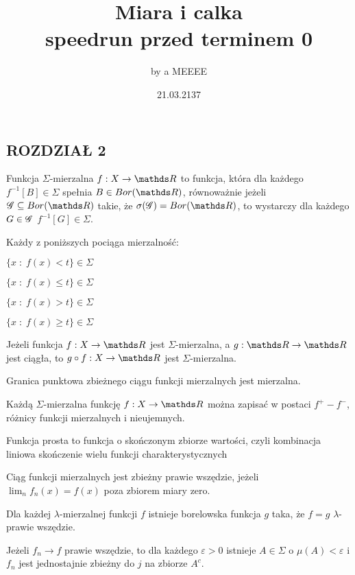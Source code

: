 \documentclass{article}[13pt]
\title{Miara i calka\medskip\\{\normalsize speedrun przed terminem 0}}
\author{by a MEEEE}
\date {21.03.2137}
\newcommand{\bor}{Bor(\R)}
\begin{document}
\maketitle
\thispagestyle{empty}

\subsection*{ROZDZIAŁ 2}

\begin{multicols}{2}
    {\color{def}Funkcja $\Sigma$-mierzalna} $f:X\to\R$ to funkcja, która dla każdego $f^{-1}[B]\in\Sigma$ spełnia $B\in\bor$, równoważnie jeżeli $\rodz{G}\subseteq\bor$ takie, że $\sigma(\rodz{G})=\bor$, to wystarczy dla każdego $G\in\mathcal{G}$ $f^{-1}[G]\in\Sigma$.
    \medskip

    Każdy z poniższych pociąga mierzalność:
    \smallskip

    $\{x\;:\;f(x)<t\}\in\Sigma$

    $\{x\;:\;f(x)\leq t\}\in\Sigma$

    $\{x\;:\;f(x)>t\}\in\Sigma$

    $\{x\;:\;f(x)\geq t\}\in \Sigma$
    \medskip

    Jeżeli funkcja $f:X\to\R$ jest $\Sigma$-mierzalna, a $g:\R\to\R$ jest ciągła, to $g\circ f:X\to\R$ jest $\Sigma$-mierzalna.
    \medskip

    {\color{acc}Granica punktowa} zbieżnego ciągu funkcji mierzalnych jest mierzalna.
    \medskip

    Każdą $\Sigma$-mierzalna funkcję $f:X\to\R$ można zapisać w postaci $f^+-f^-$, różnicy funkcji mierzalnych i nieujemnych.
    \medskip

    \medskip

    {\color{def}Funkcja prosta} to funkcja o skończonym zbiorze wartości, czyli kombinacja liniowa skończenie wielu {\color{acc}funkcji charakterystycznych}
    \medskip

    Ciąg funkcji mierzalnych jest {\color{def}zbieżny prawie wszędzie}, jeżeli $\lim_nf_n(x)=f(x)$ poza zbiorem miary zero.
    \medskip

    Dla każdej $\lambda$-mierzalnej funkcji $f$ istnieje borelowska funkcja $g$ taka, że $f=g$ $\lambda$-prawie wszędzie.
    \medskip

    Jeżeli $f_n\to f$ prawie wszędzie, to dla każdego $\varepsilon>0$ istnieje $A\in\Sigma$ o $\mu(A)<\varepsilon$ i $f_n$ jest jednostajnie zbieżny do $j$ na zbiorze $A^c$.
    \medskip


\end{multicols}
\end{document}
